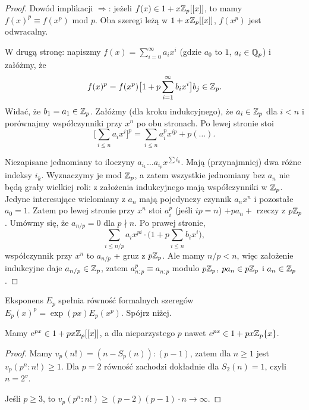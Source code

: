 \begin{proof}
	Dowód implikacji $\Rightarrow$: jeżeli $f(x) \in 1 + x \mathbb Z_p[[x]]$, to mamy $f(x)^p \equiv f(x^p)$ mod $p$.
	Oba szeregi leżą w $1+ x \mathbb Z_p[[x]]$, $f(x^p)$ jest odwracalny.

	W drugą stronę: napiszmy $f(x) = \sum_{i=0}^\infty a_i x^i$ (gdzie $a_0$  to $1$, $a_i \in \mathbb Q_p$) i załóżmy, że
	\[
		f(x)^p = f(x^p) \big[1 + p \sum_{i=1}^\infty b_i x^i \big] \hfill b_j \in \Z_p.
	\]
	Widać, że $b_1 = a_1 \in \mathbb Z_p$.
	Załóżmy (dla kroku indukcyjnego), że $a_i \in \mathbb Z_p$ dla $i < n$ i porównajmy współczynniki przy $x^n$ po obu stronach.
	Po lewej stronie stoi
	\[
		\Big[\sum_{i \le n} a_i x^i \Big]^p = \sum_{i \le n} a_i^p x^{ip} + p (\dots).
	\]

	Niezapisane jednomiany to iloczyny $a_{i_1} \dots a_{i_p} x^{\sum i_k}$.
	Mają (przynajmniej) dwa różne indeksy $i_k$.
	Wyznaczymy je mod $ \mathbb Z_p$, a zatem wszystkie jednomiany bez $a_n$ nie będą grały wielkiej roli: z założenia indukcyjnego mają współczynniki w $\mathbb Z_p$.
	Jedyne interesujące wielomiany z $a_n$ mają pojedynczy czynnik $a_n x^n$ i pozostałe $a_0 = 1$.
	Zatem po lewej stronie przy $x^n$ stoi $a_i^p$ (jeśli $ip = n$) $+ pa_n + $ rzeczy z $p\mathbb Z_p$.
	Umówmy się, że $a_{n/p} = 0$ dla $p \nmid n$.
	Po prawej stronie,
	\[
		\sum_{i \le n/p} a_i x^{pi} \cdot \Big( 1 + p \sum_{i \le n} b_i x^i\Big),
	\]
	współczynnik przy $x^n$ to $a_{n/p}$ + gruz z $p\mathbb Z_p$.
	Ale mamy $n/p < n$, więc założenie indukcyjne  daje $a_{n/p} \in \mathbb Z_p$, zatem $a_{n:p}^p \equiv a_{n:p}$ modulo $p\mathbb Z_p$, $pa_n \in p\mathbb Z_p$ i $a_n \in \mathbb Z_p$.
\end{proof}

\begin{przyklad}
	Eksponens $E_p$ spełnia równość formalnych szeregów $E_p(x)^p = \exp(px) E_p(x^p)$.
	Spójrz niżej.
\end{przyklad}

\begin{fakt}
	Mamy $e^{px} \in 1 + px \mathbb Z_p[[x]]$, a dla nieparzystego $p$ nawet $e^{px} \in 1 + px \mathbb Z_p \{x\}$.
\end{fakt}

\begin{proof}
	Mamy $v_p(n!) = (n - S_p(n)) : (p-1)$, zatem dla $n \ge 1$ jest $v_p(p^n:n!) \ge 1$.
	Dla $p = 2$ równość zachodzi dokładnie dla $S_2(n) = 1$, czyli $n = 2^v$.
	
	Jeśli $p \ge 3$, to $v_p(p^n:n!) \ge (p-2)(p-1) \cdot n \to \infty$.
\end{proof}